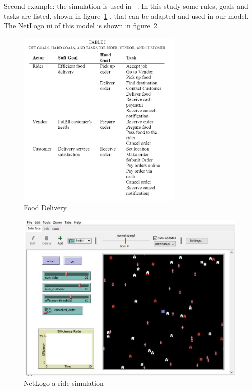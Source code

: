 \documentclass{article}
\begin{document}
    Second example: the simulation is used in ~\cite{ismail2024software}.
    In this study some rules, goals and tasks are listed, shown in figure~\ref{fig:tasktable} , that can be adapted and used in our model.
    The NetLogo ui of this model is shown in figure~\ref{fig:a-ride}.
    \begin{figure}
        \centering
        \includegraphics[width=8cm]{pics/TaskTabel}
        \caption{Food Delivery}
        \label{fig:tasktable}
    \end{figure}

    \begin{figure}
        \centering
        \includegraphics[width=\linewidth]{pics/a-ride}
        \caption{NetLogo a-ride simulation}
        \label{fig:a-ride}
    \end{figure}
\end{document}
